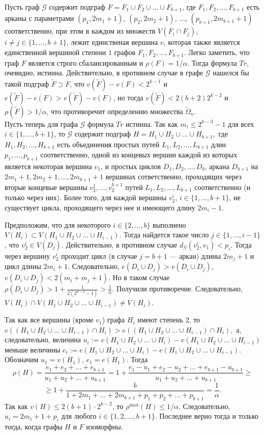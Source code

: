 \documentclass[12pt,a4paper,russian,titlepage]{article}
\begin{document}
Пусть граф $\mathcal{G}$ содержит подграф $F = F_1\cup F_2\cup\ldots\cup F_{b+1}$, где $F_1, F_2,\ldots, F_{b+1}$ есть арканы с параметрами $(p_1,2m_1+1)$, $(p_2,2m_2+1)$, $\ldots$, $(p_{b+1},2m_{b+1}+1)$ соответственно, при этом в каждом из множеств $V(F_i \cap F_j)$, $i\neq j \in \{1, \ldots ,b+1\}$, лежит единственая вершина $v$, которая также является единственной вершиной степени $1$ графов $F_1,F_2,\ldots,F_{b+1}$. Легко заметить, что граф $F$ является строго сбалансированным и $\rho(F)=1/\alpha$. Тогда формула $Tr$, очевидно, истинна. Действительно, в противном случае в графе $\mathcal{G}$ нашелся бы такой подграф $\tilde F\supset F$, что $v(\tilde F)-v(F)<2^{k-1}$ и $e(\tilde F)-e(F)>v(\tilde F)-v(F)$, но тогда $v(\tilde F)<2(b+2)2^{k-2}$ и $\rho(\tilde F)>1/\alpha$, что противоречит определению множества $\tilde\Omega_n$.\\

Пусть теперь для графа $\mathcal G$ формула $Tr$ истинна. Так как
$m_i\leq 2^{k-3}-1$ для всех $i\in\{1,\ldots,b+1\}$, то $\mathcal{G}$ содержит подграф $H = H_1 \cup H_2 \cup \ldots \cup H_{b+1},$ где $H_1, H_2, \ldots, H_{b+1}$ есть объединения простых путей $L_1,L_2,\ldots,L_{b+1}$ длин $p_1,\ldots,p_{b+1}$ соответственно, одной из концевых вершин каждой из которых является некоторая вершина $v_1$, и простых циклов $D_1,D_2,\ldots,D_{b}$, аркана $D_{b+1}$ на $2m_1+1,2m_2+1,\ldots,2m_{b+1}+1$ вершинах сответственно, проходящих через вторые концевые вершины $v_2^1,\ldots,v_2^{b+1}$ путей $L_1,L_2,\ldots,L_{b+1}$ соответственно (и только через них). Более того, для каждой вершины $v_2^i$, $i\in\{1,\ldots,b+1\}$, не существует цикла, проходящего через нее и имеющего длину $2m_i-1$.

Предположим, что для некоторого $i\in\{2,\ldots,b\}$ выполнено  $V(H_i)\subset V(H_1\cup H_2\cup\ldots\cup H_{i-1})$. Тогда найдется такое число $j\in\{1,\ldots,i-1\}$, что $v_2^i\in V(D_j)$. Действительно, в противном случае $d_{\mathcal{G}}(v_2^i,v_1)<p_i$. Тогда через вершину $v_2^i$ проходит цикл (в случае $j = b + 1$ --- аркан) длины $2m_j+1$ и цикл длины $2m_i+1$. Следовательно, $e(D_i\cup D_j)> v(D_i\cup D_j)$, $v(D_i\cup D_j)<2(m_i+m_j+1)$. Но в таком случае $\rho(D_i\cup D_j)>1+\frac{1}{2(2^{k-2}-1)}>\frac{1}{\alpha}$. Получили противоречие.  
Следовательно, $V(H_i)\cap V(H_1\cup H_2\cup\ldots\cup H_{i-1})\neq V(H_i)$. 

Так как все вершины (кроме $v_1$) графа $H_i$ имеют степень $2$, то
$v((H_1\cup H_2\cup\ldots\cup H_{i-1})\cap H_i)> e((H_1\cup H_2\cup\ldots\cup H_{i-1})\cap H_i),$
а, следовательно, величина $u_i:=v(H_1\cup H_2\cup\ldots\cup H_i)-v(H_1\cup H_2\cup\ldots\cup H_{i-1})$
меньше величины $e_i:=e(H_1\cup H_2\cup\ldots\cup H_i)-e(H_1\cup H_2\cup\ldots\cup H_{i-1}).$
Обозначим $u_1=v(H_1)$, $e_1=e(H_1)$. Тогда
$$
 \rho(H)=\frac{e_1+e_2+\ldots+e_{b+1}}{u_1+u_2+\ldots+u_{b+1}}=1+\frac{e_1-u_1+e_2-u_2+\ldots+
 e_{b+1}-u_{b+1}}{u_1+u_2+\ldots+u_{b+1}}\geq
$$
$$
  \geq 1+\frac{b}{1+2m_1+\ldots+2m_{b+1}+p_1+p_2+\ldots+p_{b+1}}=\frac{1}{\alpha}.
$$
Так как $v(H)\leq 2(b+1)\cdot 2^{k-2}$, то $\rho^{\max}(H) \leq 1/\alpha.$ Следовательно, $u_i=2m_i+1+p_i$ для любого $i\in\{1,2,\ldots,b+1\}$. Последнее верно тогда и только тогда, когда графы $H$ и $F$ изоморфны.\\
\end{document}

